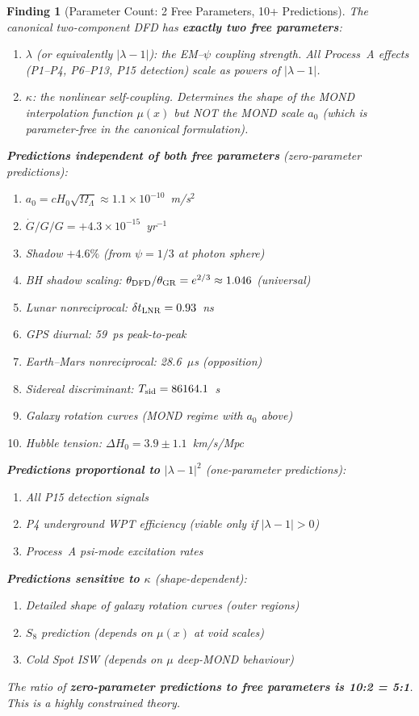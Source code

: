 \documentclass[11pt]{article}
\newtheorem{finding}{Finding}
\newcommand{\ee}[1]{\times 10^{#1}}
\newcommand{\Gdot}{\dot{G}/G}
\newcommand{\aM}{a_0}
\newcommand{\Hzero}{H_0}
\newcommand{\lamdiff}{|\lambda{-}1|}
\newcommand{\mufd}{\mu}
\begin{document}
\begin{finding}[Parameter Count: 2 Free Parameters, 10+ Predictions]
\label{find:parameter-count}
The canonical two-component DFD has \textbf{exactly two free parameters}:
\begin{enumerate}[nosep]
\item $\lambda$ (or equivalently $\lamdiff$): the EM--$\psi$ coupling strength.
  All Process~A effects (P1--P4, P6--P13, P15 detection) scale as powers
  of $\lamdiff$.
\item $\kappa$: the nonlinear self-coupling. Determines the shape of the
  MOND interpolation function $\mufd(x)$ but NOT the MOND scale $\aM$
  (which is parameter-free in the canonical formulation).
\end{enumerate}

\textbf{Predictions independent of both free parameters} (zero-parameter
predictions):
\begin{enumerate}[nosep]
\item $\aM = c\Hzero\sqrt{\Omega_\Lambda} \approx 1.1\ee{-10}$~m/s$^2$
\item $\Gdot/G = +4.3\ee{-15}$~yr$^{-1}$
\item Shadow $+4.6\%$ (from $\psi = 1/3$ at photon sphere)
\item BH shadow scaling: $\theta_{\rm DFD}/\theta_{\rm GR} = e^{2/3} \approx 1.046$ (universal)
\item Lunar nonreciprocal: $\delta t_{\rm LNR} = 0.93$~ns
\item GPS diurnal: 59~ps peak-to-peak
\item Earth--Mars nonreciprocal: 28.6~$\mu$s (opposition)
\item Sidereal discriminant: $T_{\rm sid} = 86164.1$~s
\item Galaxy rotation curves (MOND regime with $\aM$ above)
\item Hubble tension: $\Delta\Hzero = 3.9 \pm 1.1$~km/s/Mpc
\end{enumerate}

\textbf{Predictions proportional to $\lamdiff^2$} (one-parameter predictions):
\begin{enumerate}[nosep]
\item All P15 detection signals
\item P4 underground WPT efficiency (viable only if $\lamdiff > 0$)
\item Process~A psi-mode excitation rates
\end{enumerate}

\textbf{Predictions sensitive to $\kappa$} (shape-dependent):
\begin{enumerate}[nosep]
\item Detailed shape of galaxy rotation curves (outer regions)
\item $S_8$ prediction (depends on $\mufd(x)$ at void scales)
\item Cold Spot ISW (depends on $\mufd$ deep-MOND behaviour)
\end{enumerate}

The ratio of \textbf{zero-parameter predictions to free parameters is
10:2 = 5:1}. This is a highly constrained theory.
\end{finding}
\end{document}
